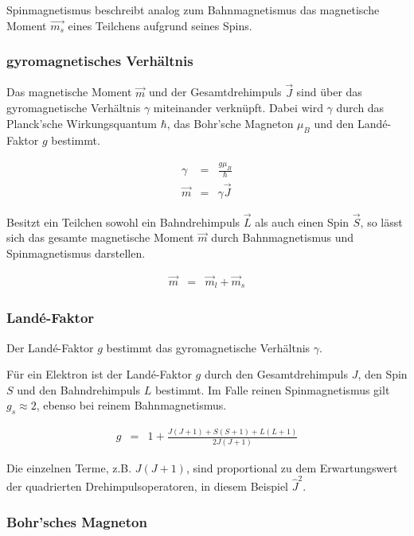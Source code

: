 \documentclass[12pt,a4paper]{scrartcl}
\numberwithin{equation}{section} %
\begin{document}
Spinmagnetismus beschreibt analog zum Bahnmagnetismus das magnetische
Moment $\vec{m_{s}}$ eines Teilchens aufgrund seines Spins.

\hypertarget{gyromagnetisches-verhuxe4ltnis}{%
\subsubsection{gyromagnetisches
Verhältnis}\label{gyromagnetisches-verhuxe4ltnis}}

Das magnetische Moment $\vec{m}$ und der Gesamtdrehimpuls $\vec{J}$
sind über das gyromagnetische Verhältnis $\gamma$ miteinander
verknüpft. Dabei wird $\gamma$ durch das Planck'sche Wirkungsquantum
$\hbar$, das Bohr'sche Magneton $\mu_{B}$ und den Landé-Faktor $g$
bestimmt.

\begin{eqnarray}
    \gamma &=& \frac{g\mu_B}{\hbar} \\
    \vec{m} &=& \gamma \vec{J}
\end{eqnarray}

Besitzt ein Teilchen sowohl ein Bahndrehimpuls $\vec L$ als auch einen
Spin $\vec S$, so lässt sich das gesamte magnetische Moment
$\vec{m}$ durch Bahnmagnetismus und Spinmagnetismus darstellen.

\begin{eqnarray}
    \vec m &=& \vec m_l + \vec m_s
\end{eqnarray}

\hypertarget{lande-faktor}{%
\subsubsection{Landé-Faktor}\label{lande-faktor}}

Der Landé-Faktor $g$ bestimmt das gyromagnetische Verhältnis
$\gamma$.

Für ein Elektron ist der Landé-Faktor $g$ durch den Gesamtdrehimpuls
$J$, den Spin $S$ und den Bahndrehimpuls $L$ bestimmt. Im Falle
reinen Spinmagnetismus gilt $g_{s} \approx 2$, ebenso bei reinem
Bahnmagnetismus.

\begin{eqnarray}
    g &=& 1 + \frac{J(J+1) + S(S+1) + L(L+1)}{2J(J+1)}
\end{eqnarray}

Die einzelnen Terme, z.B. $J(J+1)$, sind proportional zu dem
Erwartungswert der quadrierten Drehimpulsoperatoren, in diesem Beispiel
$\hat J^2$.

\hypertarget{bohrsches-magneton}{%
\subsubsection{Bohr'sches Magneton}\label{bohrsches-magneton}}
\end{document}
